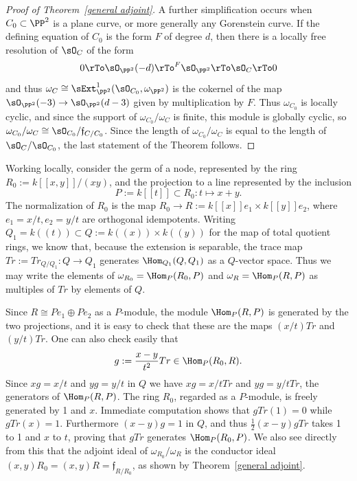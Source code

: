 \begin{proof}[Proof of Theorem~\ref{general adjoint}]
A further simplification occurs when $C_0\subset \PP^2$ is a plane curve, or more generally any 
Gorenstein curve.
If the defining equation of 
$C_0$ is the form $F$ of degree $d$, then there is a locally free resolution of  $\sO_C$ of the form
$$
0\rTo \sO_{\PP^2}(-d) \rTo^F \sO_{\PP^2} \rTo \sO_C \rTo 0
$$
and thus $\omega_C \cong \sExt^1_{\PP^2}(\sO_{C_0}, \omega_{\PP^2})$
is the cokernel of the map $\sO_{\PP^2}(-3) \to \sO_{\PP^2}(d-3)$ given by multiplication by $F$. Thus
$\omega_{C_0}$ is locally cyclic, and  since the support of $\omega_{C_0}/\omega_C$ is finite, this module is
 globally cyclic, so
$\omega_{C_0}/\omega_C \cong \sO_{C_0}/\mathfrak f_{C/C_0}$.
Since the length of $\omega_{C_0}/\omega_C$ is equal to the length of 
$\sO_{C}/\sO_{C_0}$, the last statement of the Theorem follows.
\end{proof}

\begin{example}
 Working locally, consider the germ of a node, represented by the ring $R_0:= k[[x,y]]/(xy)$, and
 the projection to a line represented by the inclusion 
 $$
 P:= k[[t]] \subset R_0: t\mapsto x+y.
 $$
 The normalization of $R_0$ is the map $R_0 \to R := k[[x]]e_1\times k[[y]]e_2$,
 where $e_1= x/t, e_2= y/t$ are orthogonal idempotents. Writing 
 $Q_1 = k((t)) \subset Q:= k((x))\times k((y))$
 for the map of total quotient rings, we know that, because the extension is separable, the trace map
 $Tr := Tr_{Q/Q_1}: Q \to Q_1$ generates $\Hom_{Q_1}(Q,Q_1)$ as a $Q$-vector space. Thus we may write the
 elements of $\omega_{R_0} = \Hom_{P}(R_0,P)$ and $\omega_R = \Hom_{P}(R,P)$ as
 multiples of $Tr$ by elements of $Q$.
 
 Since $R \cong Pe_1\oplus Pe_2$ as a $P$-module, the module $\Hom_P(R,P)$ is
 generated by the two projections, and it is easy to check that these are the maps
 $(x/t)Tr$ and $(y/t)Tr$. One can also check easily that 
 $$
 g := \frac{x-y}{t^2} Tr \in \Hom_P(R_0,R).
 $$
 Since
$xg = x/t$ and $yg = y/t$ in $Q$ we have
 $xg = x/tTr$ and $yg= y/tTr$, the generators of $\Hom_{P}(R,P)$. 
 The ring $R_0$, regarded as a $P$-module, is freely generated by 1 and $x$.
 Immediate computation shows that $gTr(1) = 0$ while $gTr(x) = 1$.
 Furthermore $(x-y)g = 1$ in $Q$,  and thus $\frac{1}{2}(x-y)gTr$ takes 1 to 1
 and $x$ to $t$, proving that $gTr$  generates
 $\Hom_P(R_0,P)$. We also see directly from this that the adjoint ideal
 of $\omega_{R_0}/\omega_R$ is the conductor ideal $(x,y)R_0 = (x,y)R = \mathfrak f_{R/R_0}$,
 as shown by  Theorem~\ref{general adjoint}. 
\end{example}

